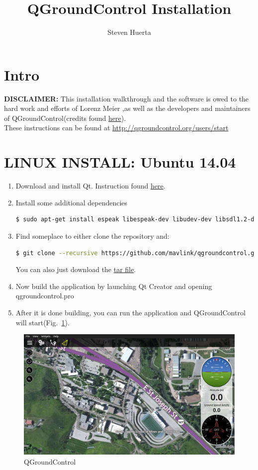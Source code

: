\documentclass[10pt,a4paper,notitlepage]{report}
\author{Steven Huerta}
\title{QGroundControl Installation}
\begin{document}
\maketitle
\section*{Intro}
\noindent \textbf{DISCLAIMER:} This installation walkthrough and the software is owed to the hard work and efforts of Lorenz Meier ,as well as the developers and maintainers of QGroundControl(credits found \href{http://qgroundcontrol.org/credits}{here}).\\

\noindent These instructions can be found at \hspace{2mm} \url{http://qgroundcontrol.org/users/start}\\

\section*{LINUX INSTALL: Ubuntu 14.04}
\begin{enumerate}
\item Download and install Qt. Instruction found \href{https://wiki.qt.io/Install_Qt_5_on_Ubuntu}{here}.
\item Install some additional dependencies
\begin{lstlisting}[language=bash]
$ sudo apt-get install espeak libespeak-dev libudev-dev libsdl1.2-dev
\end{lstlisting}
\item Find someplace to either clone the repository and: 
\begin{lstlisting}[language=bash]
$ git clone --recursive https://github.com/mavlink/qgroundcontrol.git
\end{lstlisting}
You can also just download the \href{http://qgroundcontrol.s3.amazonaws.com/master/qgroundcontrol.tar.bz2?dl=0}{tar file}.
\item Now build the application by launching Qt Creator and opening qgroundcontrol.pro
\item After it is done building, you can run the application and QGroundControl will start(Fig.~\ref{fig:gcs}).
\end{enumerate}

\begin{figure}[h]
\includegraphics[scale=.35]{qgroundcontrol.png}
\caption{QGroundControl}
\label{fig:gcs}
\end{figure}
\end{document}
